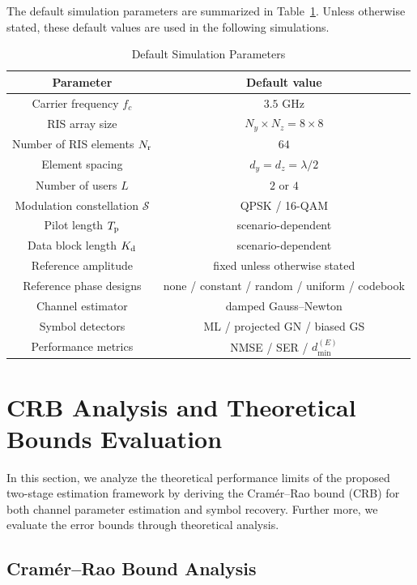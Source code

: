 \documentclass[journal]{IEEEtran}
\begin{document}
The default simulation parameters are summarized in Table~\ref{tab:simulation_parameters}. 
Unless otherwise stated, these default values are used in the following simulations.

\begin{table}[t]
\centering
\caption{Default Simulation Parameters}
\label{tab:simulation_parameters}
\begin{tabular}{c|c}
\hline
\textbf{Parameter} & \textbf{Default value} \\
\hline
Carrier frequency $f_c$ & $3.5$ GHz \\
RIS array size & $N_y\times N_z=8\times 8$ \\
Number of RIS elements $N_{\rm r}$ & $64$ \\
Element spacing & $d_y=d_z=\lambda/2$ \\
Number of users $L$ & $2$ or $4$ \\
Modulation constellation $\mathcal{S}$ & QPSK / 16-QAM \\
Pilot length $T_{\rm p}$ & scenario-dependent \\
Data block length $K_{\rm d}$ & scenario-dependent \\
Reference amplitude & fixed unless otherwise stated \\
Reference phase designs & none / constant / random / uniform / codebook \\
Channel estimator & damped Gauss--Newton \\
Symbol detectors & ML / projected GN / biased GS \\
Performance metrics & NMSE / SER / $d_{\min}^{(E)}$ \\
\hline
\end{tabular}
\end{table}



\section{CRB Analysis and Theoretical Bounds Evaluation}
In this section, we analyze the theoretical performance limits of the proposed two-stage estimation framework by deriving the Cram\'er--Rao bound (CRB) for both channel parameter estimation and symbol recovery. Further more, we evaluate the error bounds through theoretical analysis.

\subsection{Cram\'er--Rao Bound Analysis}
\end{document}
